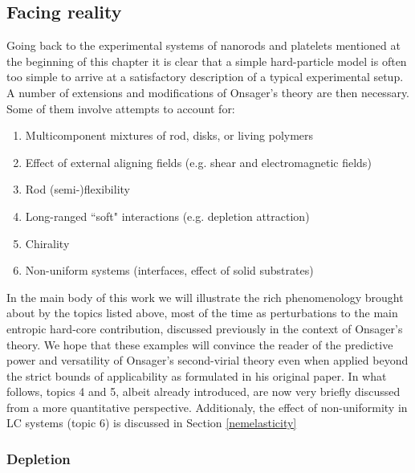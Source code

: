 \subsection{Facing reality}

Going back to the experimental systems of nanorods and platelets mentioned at the beginning of this chapter it is clear that a simple hard-particle model is often too simple to arrive at a satisfactory description of a typical experimental setup. A number of extensions and modifications of Onsager's theory are then necessary. Some of them involve attempts to account for:

\begin{enumerate}
\item Multicomponent mixtures of rod, disks, or living polymers
\item Effect of external aligning fields (e.g. shear and electromagnetic fields)
\item Rod (semi-)flexibility 
\item Long-ranged ``soft" interactions (e.g. depletion attraction)
\item Chirality
\item Non-uniform systems (interfaces, effect of solid substrates)
\end{enumerate}
In the main body of this work we will illustrate the rich phenomenology brought about by the topics listed above, most of the time as perturbations to the main entropic hard-core contribution, discussed previously in the context of Onsager's theory. We hope that these examples will convince the reader of the predictive power and versatility of Onsager's second-virial theory even when applied beyond the strict bounds of applicability as formulated in his original paper. In what follows, topics 4 and 5, albeit already introduced, are now very briefly discussed from a more quantitative perspective. Additionaly, the effect of non-uniformity in LC systems (topic 6) is discussed in Section \ref{nemelasticity}

\subsubsection{Depletion}

